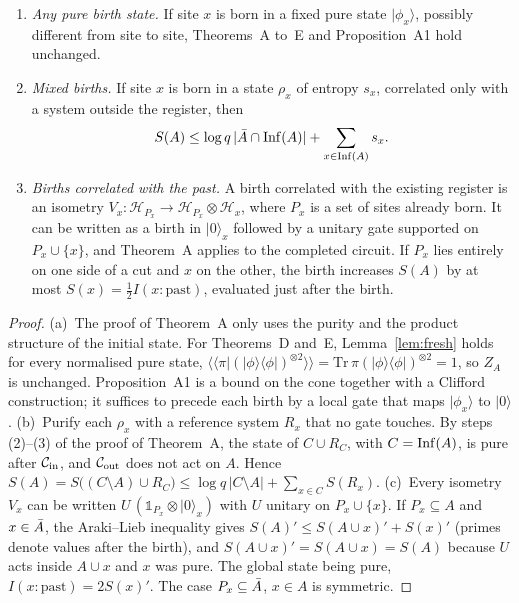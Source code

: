 \begin{proposition}\label{prop:births}
\begin{enumerate}[label=(\alph*),leftmargin=*]
\item \emph{Any pure birth state.} If site $x$ is born in a fixed pure state $|\phi_x\rangle$, possibly different from site to site, Theorems~A to~E and Proposition~A1 hold unchanged.
\item \emph{Mixed births.} If site $x$ is born in a state $\rho_x$ of entropy $s_x$, correlated only with a system outside the register, then
\begin{equation}\label{eq:Amixed}
S(A)\le\log q\,|\bar A\cap\mathrm{Inf}(A)|+\sum_{x\in\mathrm{Inf}(A)}s_x .
\end{equation}
\item \emph{Births correlated with the past.} A birth correlated with the existing register is an isometry $V_x:\mathcal H_{P_x}\to\mathcal H_{P_x}\otimes\mathcal H_x$, where $P_x$ is a set of sites already born. It can be written as a birth in $|0\rangle_x$ followed by a unitary gate supported on $P_x\cup\{x\}$, and Theorem~A applies to the completed circuit. If $P_x$ lies entirely on one side of a cut and $x$ on the other, the birth increases $S(A)$ by at most $S(x)=\tfrac12 I(x{:}\text{past})$, evaluated just after the birth.
\end{enumerate}
\end{proposition}
\begin{proof}
(a)~The proof of Theorem~A only uses the purity and the product structure of the initial state. For Theorems~D and~E, Lemma~\ref{lem:fresh} holds for every normalised pure state, $\langle\!\langle\pi|(|\phi\rangle\langle\phi|)^{\otimes2}\rangle\!\rangle=\mathrm{Tr}\,\pi(|\phi\rangle\langle\phi|)^{\otimes2}=1$, so $Z_A$ is unchanged. Proposition~A1 is a bound on the cone together with a Clifford construction; it suffices to precede each birth by a local gate that maps $|\phi_x\rangle$ to $|0\rangle$.
(b)~Purify each $\rho_x$ with a reference system $R_x$ that no gate touches. By steps (2)--(3) of the proof of Theorem~A, the state of $C\cup R_C$, with $C=\mathrm{Inf}(A)$, is pure after $\mathcal C_{\rm in}$, and $\mathcal C_{\rm out}$ does not act on $A$. Hence $S(A)=S\big((C\setminus A)\cup R_C\big)\le\log q\,|C\setminus A|+\sum_{x\in C}S(R_x)$.
(c)~Every isometry $V_x$ can be written $U\,(\mathbb 1_{P_x}\otimes|0\rangle_x)$ with $U$ unitary on $P_x\cup\{x\}$. If $P_x\subseteq A$ and $x\in\bar A$, the Araki--Lieb inequality gives $S(A)'\le S(A\cup x)'+S(x)'$ (primes denote values after the birth), and $S(A\cup x)'=S(A\cup x)=S(A)$ because $U$ acts inside $A\cup x$ and $x$ was pure. The global state being pure, $I(x{:}\text{past})=2S(x)'$. The case $P_x\subseteq\bar A$, $x\in A$ is symmetric.
\end{proof}

